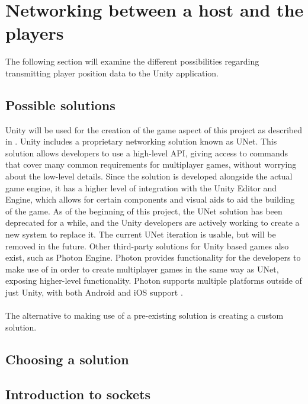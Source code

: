 \section{Networking between a host and the players}
The following section will examine the different possibilities regarding transmitting player position data to the Unity application.

\subsection{Possible solutions}
Unity will be used for the creation of the game aspect of this project as described in .
Unity includes a proprietary networking solution known as UNet\cite{unityunet}.
This solution allows developers to use a high-level API, giving access to commands that cover many common requirements for multiplayer games, without worrying about the low-level details.
Since the solution is developed alongside the actual game engine, it has a higher level of integration with the Unity Editor and Engine, which allows for certain components and visual aids to aid the building of the game.
As of the beginning of this project, the UNet solution has been deprecated for a while, and the Unity developers are actively working to create a new system to replace it.
The current UNet iteration is usable, but will be removed in the future.
Other third-party solutions for Unity based games also exist, such as Photon Engine.
Photon provides functionality for the developers to make use of in order to create multiplayer games in the same way as UNet, exposing higher-level functionality.
Photon supports multiple platforms outside of just Unity, with both Android and iOS support \cite{photonnet}.
\\\\
The alternative to making use of a pre-existing solution is creating a custom solution.

\subsection{Choosing a solution}


\subsection{Introduction to sockets}

